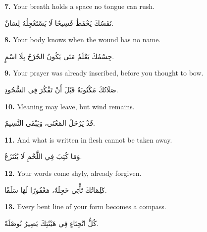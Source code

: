 \documentclass[11pt,a4paper,twoside]{book}
\begin{document}
\vspace{1em}
{\color{indigo}\bfseries 7.}\quad
Your breath holds a space no tongue can rush.

\begin{flushright}
{\arabicfont
نَفَسُكَ يَحْفَظُ فَسِيحًا لَا يَسْتَعْجِلُهُ لِسَانٌ.}
\end{flushright}

\vspace{1em}
{\color{indigo}\bfseries 8.}\quad
Your body knows when the wound has no name.

\begin{flushright}
{\arabicfont
جِسْمُكَ يَعْلَمُ مَتَى يَكُونُ الجُرْحُ بِلَا اسْمٍ.}
\end{flushright}

\vspace{1em}
{\color{indigo}\bfseries 9.}\quad
Your prayer was already inscribed, before you thought to bow.

\begin{flushright}
{\arabicfont
صَلَاتُكَ مَكْتُوبَةٌ قَبْلَ أَنْ تَفْكُرَ فِي السُّجُودِ.}
\end{flushright}

\vspace{1em}
{\color{indigo}\bfseries 10.}\quad
Meaning may leave, but wind remains.

\begin{flushright}
{\arabicfont
قَدْ يَرْحَلُ المَعْنَى، وَيَبْقَى النَّسِيمُ.}
\end{flushright}

\vspace{1em}
{\color{indigo}\bfseries 11.}\quad
And what is written in flesh cannot be taken away.

\begin{flushright}
{\arabicfont
وَمَا كُتِبَ فِي اللَّحْمِ لَا يُنْتَزَعُ.}
\end{flushright}

\vspace{1em}
{\color{indigo}\bfseries 12.}\quad
Your words come shyly, already forgiven.

\begin{flushright}
{\arabicfont
كَلِمَاتُكَ تَأْتِي خَجِلَةً، مَغْفُورًا لَهَا سَلَفًا.}
\end{flushright}

\vspace{1em}
{\color{indigo}\bfseries 13.}\quad
Every bent line of your form becomes a compass.

\begin{flushright}
{\arabicfont
كُلُّ انْحِنَاءٍ فِي هَيْئَتِكَ يَصِيرُ بُوصْلَةً.}
\end{flushright}
\end{document}
